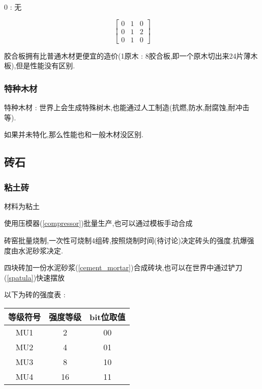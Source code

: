 {{{\begin{center}
              0 : 无

              $$
                  \begin{bmatrix}
                      0 & 1 & 0 \\
                      0 & 1 & 2 \\
                      0 & 1 & 0
                  \end{bmatrix}
              $$
          \end{center}

          胶合板拥有比普通木材更便宜的造价(1原木 : 8胶合板,即一个原木切出来24片薄木板),但是性能没有区别.
      }

      \subsubsection{特种木材}{
          特种木材 : 世界上会生成特殊树木,也能通过人工制造(抗燃,防水,耐腐蚀,耐冲击等).

          如果并未特化,那么性能也和一般木材没区别.
      }
  }

  \subsection{砖石}{

      \subsubsection{粘土砖}{
          材料为粘土

          使用压模器({\ref{compressor}})批量生产,也可以通过模板手动合成

          砖窑批量烧制,一次性可烧制4组砖,按照烧制时间(待讨论)决定砖头的强度.抗爆强度由水泥砂浆决定.

          四块砖加一份水泥砂浆({\ref{cement_mortar}})合成砖块,也可以在世界中通过铲刀({\ref{spatula}})快速摆放

          以下为砖的强度表 :

          \begin{center}
              \begin{tabular}{|c|c|c|}
                  \hline
                  等级符号 & 强度等级 & bit位取值 \\
                  \hline
                  MU1      & 2        & 00        \\
                  \hline
                  MU2      & 4        & 01        \\
                  \hline
                  MU3      & 8        & 10        \\
                  \hline
                  MU4      & 16       & 11        \\
                  \hline
              \end{tabular}
          \end{center}
      }

}}
